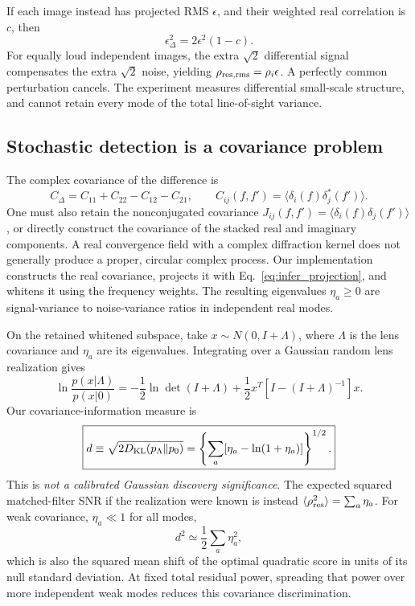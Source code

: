 If each image instead has projected RMS \(\epsilon\), and their weighted real
correlation is \(c\), then
\begin{equation}
 \epsilon_\Delta^2=2\epsilon^2(1-c).
\end{equation}
For equally loud independent images, the extra \(\sqrt{2}\) differential signal
compensates the extra \(\sqrt{2}\) noise, yielding
\(\rho_{\rm res,rms}=\rho_i\epsilon\). A perfectly common perturbation cancels.
The experiment measures differential small-scale structure, and cannot retain
every mode of the total line-of-sight variance.

\subsection{Stochastic detection is a covariance problem}

The complex covariance of the difference is
\begin{equation}
 C_\Delta=C_{11}+C_{22}-C_{12}-C_{21},\qquad
 C_{ij}(f,f')=\langle\delta_i(f)\delta_j^*(f')\rangle.
\end{equation}
One must also retain the nonconjugated covariance
\(J_{ij}(f,f')=\langle\delta_i(f)\delta_j(f')\rangle\), or directly construct
the covariance of the stacked real and imaginary components. A real convergence
field with a complex diffraction kernel does not generally produce a proper,
circular complex process. Our implementation constructs the real covariance,
projects it with Eq.~\eqref{eq:infer_projection}, and whitens it using the
frequency weights. The resulting eigenvalues \(\eta_a\geq0\) are signal-variance
to noise-variance ratios in independent real modes.

On the retained whitened subspace, take \(x\sim N(0,I+\Lambda)\), where
\(\Lambda\) is the lens covariance and \(\eta_a\) are its eigenvalues. Integrating
over a Gaussian random lens realization gives
\begin{equation}
 \ln\frac{p(x|\Lambda)}{p(x|0)}=
 -\frac12\ln\det(I+\Lambda)
 +\frac12x^T[I-(I+\Lambda)^{-1}]x.
\end{equation}
Our covariance-information measure is
\begin{equation}
 \boxed{d\equiv\sqrt{2D_{\rm KL}(p_\Lambda\Vert p_0)}
 =\left\{\sum_a[\eta_a-\ln(1+\eta_a)]\right\}^{1/2}.}
 \label{eq:infer_KL}
\end{equation}
This is \emph{not a calibrated Gaussian discovery significance}. The expected
squared matched-filter SNR if the realization were known is instead
\(\langle\rho_{\rm res}^2\rangle=\sum_a\eta_a\).
For weak covariance, \(\eta_a\ll1\) for all modes,
\begin{equation}
 d^2\simeq \frac12\sum_a\eta_a^2,
\end{equation}
which is also the squared mean shift of the optimal quadratic score in units of
its null standard deviation. At fixed total residual power, spreading that
power over more independent weak modes reduces this covariance discrimination.

